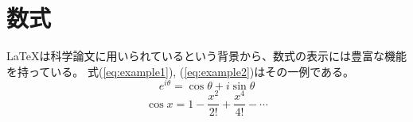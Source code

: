 \documentclass[uplatex, a4paper,twocolumn, 14pt]{jsarticle}
\begin{document}
\section{数式 \label{sec:equation}}

LaTeXは科学論文に用いられているという背景から、数式の表示には豊富な機能を持っている。
式(\ref{eq:example1}), (\ref{eq:example2})はその一例である。
\begin{equation} \label{eq:example1}
    e^{i \theta} = \cos{\theta} + i \sin{\theta}
\end{equation}
\begin{equation} \label{eq:example2}
    \cos{x} = 1 - \frac{x^2}{2!} + \frac{x^4}{4!} - \cdots
\end{equation}

{}

\end{document}
